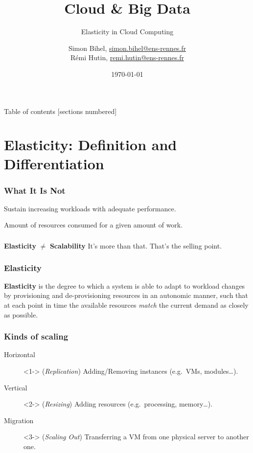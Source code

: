 \documentclass{beamer}
\title{Cloud \& Big Data}
\subtitle{Elasticity in Cloud Computing}
\date{\today}
\author{%
  Simon Bihel, \url{simon.bihel@ens-rennes.fr} \\
  Rémi Hutin, \url{remi.hutin@ens-rennes.fr}
}
\institute{%
  University of Rennes I \\
  École normale supérieure de Rennes
}
\begin{document}
\maketitle

\begin{frame}{Table of contents}
  [sections numbered]
  \tableofcontents[hideallsubsections]
\end{frame}


\section{Elasticity: Definition and Differentiation}
\begin{frame}
  \frametitle{What It Is Not~\cite{herbst2013elasticity}}
  \begin{description}
    \parbox{\linewidth}{%
    \item[Scalability] Sustain increasing workloads with adequate performance.
    \item[Efficiency] Amount of resources consumed for a given amount of work.
    }
  \end{description}
\end{frame}


\begin{frame}
  \frametitle{}
  \centering
  \Large\textbf{Elasticity} $\neq$ \textbf{Scalability}
  \pause{}
  It's more than that. That's the selling point.
\end{frame}

\begin{frame}
  \frametitle{Elasticity~\cite{herbst2013elasticity}~\cite{galante2012survey}~\cite{gulati2011cloud}}
  \begin{definition}
  \parbox{\linewidth}{\textbf{Elasticity} is the degree to which a system is able to adapt to workload changes by provisioning and de-provisioning resources in an autonomic manner, such that at each point in time the available resources \textit{match} the current demand as closely as possible.}
  \end{definition}
\end{frame}

\begin{frame}
  \frametitle{Kinds of scaling}
  \begin{description}
    \item[Horizontal]<1-> (\textit{Replication}) Adding/Removing instances (e.g.\ VMs, modules\dots).
    \item[Vertical]<2-> (\textit{Resizing}) Adding resources (e.g.\ processing, memory\dots).
    \item[Migration]<3-> (\textit{Scaling Out}) Transferring a VM from one physical server to another one.
  \end{description}
\end{frame}
\end{document}
